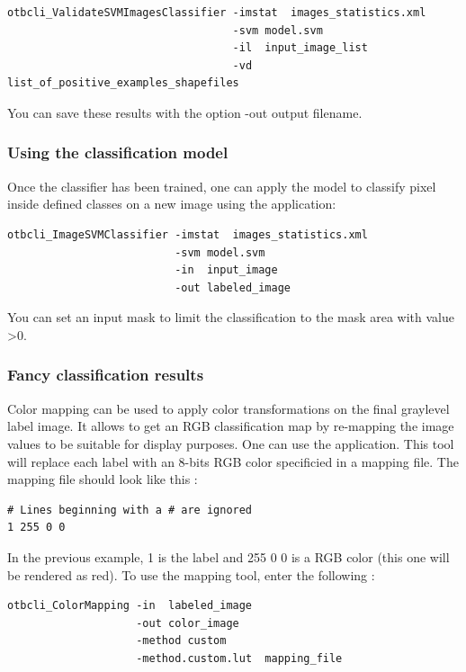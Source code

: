 \begin{verbatim}
otbcli_ValidateSVMImagesClassifier -imstat  images_statistics.xml
                                   -svm model.svm
                                   -il  input_image_list
                                   -vd  list_of_positive_examples_shapefiles
\end{verbatim}

You can save these results with the option -out output filename.

\subsubsection{Using the classification model}
Once the classifier has been trained, one can apply the model to classify
pixel inside defined classes on a new image using the
 application:

\begin{verbatim}
otbcli_ImageSVMClassifier -imstat  images_statistics.xml
                          -svm model.svm
                          -in  input_image
                          -out labeled_image
\end{verbatim}

You can set an input mask to limit the classification to the mask area with
value \textgreater 0.

\subsubsection{Fancy classification results}

Color mapping can be used to apply color transformations on the final
graylevel label image. It allows to get an RGB classification map
by re-mapping the image values to be suitable for display purposes.
One can use the  application. This tool will
replace each label with an 8-bits RGB color specificied in a mapping
file. The mapping file should look like this :

\begin{verbatim}
# Lines beginning with a # are ignored
1 255 0 0
\end{verbatim}

In the previous example, 1 is the label and 255 0 0 is a RGB color
(this one will be rendered as red). To use the mapping tool, enter
the following :

\begin{verbatim}
otbcli_ColorMapping -in  labeled_image
                    -out color_image
                    -method custom
                    -method.custom.lut  mapping_file
\end{verbatim}


